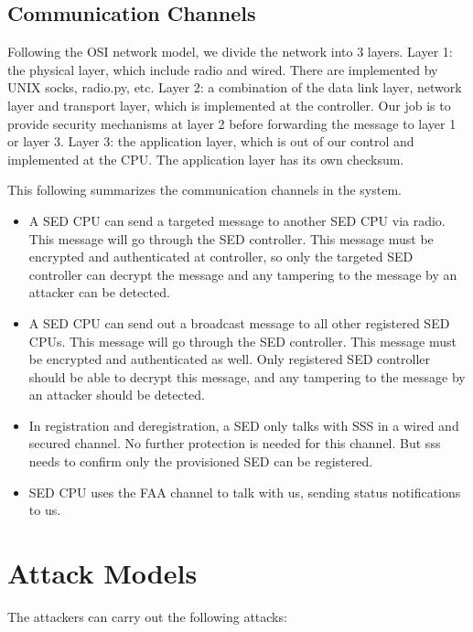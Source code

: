 \documentclass[11pt,oneside,onecolumn,letterpaper]{article}
\begin{document}
\subsection{Communication Channels}

Following the OSI network model, we divide the network into 3 layers. 
Layer 1: the physical layer, which include radio and wired. There are implemented by UNIX socks, radio.py, etc.
Layer 2: a combination of the data link layer, network layer and transport layer, which is implemented at the controller. 
Our job is to provide security mechanisms at layer 2 before forwarding the message to layer 1 or layer 3.
Layer 3: the application layer, which is out of our control and implemented at the CPU. The application layer has its own checksum.

This following summarizes the communication channels in the system.

\begin{itemize}
	\item A SED CPU can send a targeted message to another SED CPU via radio. This message will go through the SED controller. This message must be encrypted and authenticated at controller, so only the targeted SED controller can decrypt the message and any tampering to the message by an attacker can be detected. 
	
	\item A SED CPU can send out a broadcast message to all other registered SED CPUs. This message will go through the SED controller. This message must be encrypted and authenticated as well. Only registered SED controller should be able to decrypt this message, and any tampering to the message by an attacker should be detected. 
	
	\item In registration and deregistration, a SED only talks with SSS in a wired and secured channel. No further protection is needed for this channel. 
	But sss needs to confirm only the provisioned SED can be registered.
	
	\item SED CPU uses the FAA channel to talk with us, sending status notifications to us.
\end{itemize}

\section{Attack Models}

The attackers can carry out the following attacks:
\end{document}
